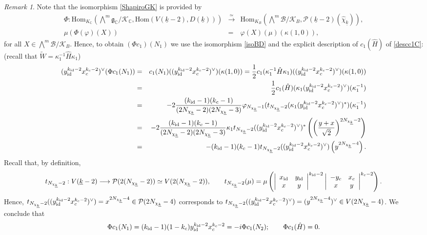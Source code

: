 \documentclass{amsart}
\theoremstyle{definition}
\theoremstyle{remark}
\newtheorem{remark}[theorem]{Remark}
\numberwithin{equation}{section}
\newcommand{\C}{{\mathbb C}}
\newcommand{\cB}{{\mathcal B}}
\newcommand{\cK}{{\mathcal K}}
\newcommand{\cP}{{\mathcal P}}
\newcommand{\mfg}{{\mathfrak g}}
\newcommand{\Hom}{{\mathrm {Hom}}}
\begin{document}
\begin{remark}
Note that the isomorphism \eqref{ShapiroGK} is provided by 
\begin{eqnarray}\label{Phieq}
\Phi:\Hom_{K_\C}\left(\bigwedge^m\mfg_\C/\cK_\C,\Hom(V(\underline k-2),D({\underline k})) \right)&\stackrel{\simeq}{\longrightarrow} &\Hom_{K_B}\left(\bigwedge^m\cB/\cK_B,\cP(\underline k-2)(\hat\chi_{\underline k}) \right),\\
\mu(\Phi(\varphi)(X))&=&\varphi(X)(\mu)(\kappa(1,0)),
\end{eqnarray}
for all $X\in\bigwedge^m\cB/\cK_B$.
Hence, to obtain $(\Phi c_1)(N_1)$ we use the isomorphism \eqref{isoBD} and the  explicit description of $c_1(\hat H)$ of \eqref{descc1C}: (recall that $\tilde W=\kappa_1^{-1}\hat H\kappa_1$)
\begin{eqnarray*}
    (y_{\rm id}^{k_{\rm id}-2}x_c^{k_c-2})^\vee (\Phi c_1(N_1))&=&c_1(N_1)((y_{\rm id}^{k_{\rm id}-2}x_c^{k_c-2})^\vee)(\kappa(1,0))=\frac{1}{2}c_1(\kappa_1^{-1}\hat H\kappa_1)((y_{\rm id}^{k_{\rm id}-2}x_c^{k_c-2})^\vee)(\kappa(1,0))\\
    &=&\frac{1}{2}c_1(\hat H)(\kappa_1(y_{\rm id}^{k_{\rm id}-2}x_c^{k_c-2})^\vee)(\kappa_1^{-1})\\
    &=&-2\frac{(k_{\rm id}-1)(k_c-1)}{(2N_{\chi_{\underline k}}-2)(2N_{\chi_{\underline k}}-3)}\varphi_{N_{\chi_{\underline k}}-1}(t_{N_{\chi_{\underline k}}-2}(\kappa_1(y_{\rm id}^{k_{\rm id}-2}x_c^{k_c-2})^\vee)^*)(\kappa_1^{-1})\\
    &=&-2\frac{(k_{\rm id}-1)(k_c-1)}{(2N_{\chi_{\underline k}}-2)(2N_{\chi_{\underline k}}-3)}\kappa_1t_{N_{\chi_{\underline k}}-2}((y_{\rm id}^{k_{\rm id}-2}x_c^{k_c-2})^\vee)^*\left(\left(\frac{y+x}{\sqrt{2}}\right)^{2N_{\chi_{\underline k}}-2}\right)\\
    &=&-(k_{\rm id}-1)(k_c-1)t_{N_{\chi_{\underline k}}-2}((y_{\rm id}^{k_{\rm id}-2}x_c^{k_c-2})^\vee)\left(y^{2N_{\chi_{\underline k}}-4}\right).
\end{eqnarray*}
Recall that, by definition,
\[
t_{N_{\chi_{\underline k}}-2}:V(\underline{k}-2)\longrightarrow \cP(2({N_{\chi_{\underline k}}-2}))\simeq V(2({N_{\chi_{\underline k}}-2})),\qquad t_{N_{\chi_{\underline k}}-2}(\mu)=\mu\left(\left|\begin{array}{cc}x_{\rm id}&y_{\rm id}\\x&y\end{array}\right|^{k_{\rm id}-2}\left|\begin{array}{cc}-y_{c}&x_{c}\\x&y\end{array}\right|^{k_c-2}\right).
\]
Hence, $t_{N_{\chi_{\underline k}}-2}((y_{\rm id}^{k_{\rm id}-2}x_c^{k_c-2})^\vee)=x^{2N_{\chi_{\underline k}}-4}\in\cP(2N_{\chi_{\underline k}}-4)$ corresponds to 
$t_{N_{\chi_{\underline k}}-2}((y_{\rm id}^{k_{\rm id}-2}x_c^{k_c-2})^\vee)=(y^{2N_{\chi_{\underline k}}-4})^\vee\in V(2N_{\chi_{\underline k}}-4)$.
We conclude that
\[
\Phi c_1(N_1)=(k_{\rm id}-1)(1-k_c)y_{\rm id}^{k_{\rm id}-2}x_c^{k_c-2}=-i\Phi c_1(N_2);\qquad \Phi c_1(\hat H)=0.
\]
\end{remark}
\end{document}
